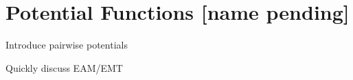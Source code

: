 \section{Potential Functions [name pending]}
\label{sec:potentials}

\bit
\item Introduce pairwise potentials
\item Quickly discuss EAM/EMT
\eit
